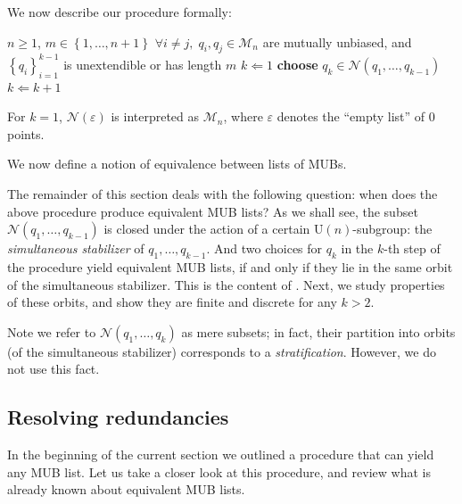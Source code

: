 \documentclass[referee,sn-mathphys-num]{sn-jnl}%
\theoremstyle{thmstyleone}%
\theoremstyle{thmstyletwo}%
\theoremstyle{remark}
\theoremstyle{thmstylethree}%
\newtheorem{definition}[theorem]{Definition}%
\begin{document}
We now describe our procedure formally:
\begin{algorithmic}[1]
	\Require $n \geq 1$, $ m \in \left\{ 1, \ldots, n+1 \right\} $
	\Ensure $\forall i \neq j, \; q_i, q_j \in \mathcal{M}_n$ are mutually unbiased, and $ \left\{ q_i \right\}_{i=1}^{k-1} $ is unextendible or has length $m$
	\State $ k \Leftarrow 1 $
	\State \textbf{choose} $ q_{k} \in \mathcal{N} \left( q_1, \ldots, q_{k-1} \right) $
	\State $ k \Leftarrow k+1 $
	\EndWhile
\end{algorithmic}
For $k=1$, $ \mathcal{N} \left( \varepsilon \right) $ is interpreted as $ \mathcal{M}_n $, where $ \varepsilon $ denotes the ``empty list'' of $0$ points.

We now define a notion of equivalence between lists of MUBs.
The remainder of this section deals with the following question: when does the above procedure produce equivalent MUB lists? As we shall see, the subset $\mathcal{N} \left( q_1, \ldots, q_{k-1} \right)$ is closed under the action of a certain $ \mathrm{U} \left( n \right) $-subgroup: the \textit{simultaneous stabilizer} of $ q_1, \ldots, q_{k-1} $. And two choices for $q_k$ in the $k$-th step of the procedure yield equivalent MUB lists, if and only if they lie in the same orbit of the simultaneous stabilizer. This is the content of . Next, we study properties of these orbits, and show they are finite and discrete for any $k>2$.

Note we refer to $\mathcal{N} \left( q_1, \ldots, q_k \right)$ as mere subsets; in fact, their partition into orbits (of the simultaneous stabilizer) corresponds to a \textit{stratification}. However, we do not use this fact.

\subsection{Resolving redundancies}\label{sec:redundancies}
In the beginning of the current section we outlined a procedure that can yield any MUB list. Let us take a closer look at this procedure, and review what is already known about equivalent MUB lists.
\end{document}
